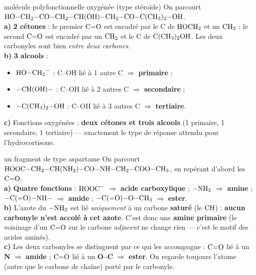 \documentclass[11pt,a4paper]{article}
\newcommand{\rep}[1]{\textcolor{primarydark}{\textbf{#1}}}
\begin{document}
\begin{corr}{molécule polyfonctionnelle oxygénée (type stéroïde)}
On parcourt $\ce{HO-CH2-CO-CH2-CH(OH)-CH2-CO-C(CH3)2-OH}$.\\
\textbf{a)} \rep{2 cétones} : le premier $\ce{C=O}$ est encadré par le C de $\ce{HOCH2}$ et un $\ce{CH2}$ ; le second $\ce{C=O}$ est encadré par un $\ce{CH2}$ et le C de $\ce{C(CH3)2OH}$. Les deux carbonyles sont bien \emph{entre deux carbones}.\\
\textbf{b)} \rep{3 alcools} :
\begin{itemize}[leftmargin=1.6em,itemsep=0pt]
  \item $\ce{HO-CH2-}$ : C--OH lié à 1 autre C $\Rightarrow$ \rep{primaire} ;
  \item $\ce{-CH(OH)-}$ : C--OH lié à 2 autres C $\Rightarrow$ \rep{secondaire} ;
  \item $\ce{-C(CH3)2-OH}$ : C--OH lié à 3 autres C $\Rightarrow$ \rep{tertiaire}.
\end{itemize}
\textbf{c)} Fonctions oxygénées : \rep{deux cétones et trois alcools} (1 primaire, 1 secondaire, 1 tertiaire) — exactement le type de réponse attendu pour l'hydrocortisone.
\end{corr}

\begin{corr}{un fragment de type aspartame}
On parcourt $\ce{HOOC-CH2-CH(NH2)-CO-NH-CH2-COO-CH3}$, en repérant d'abord les $\ce{C=O}$.\\
\textbf{a)} \rep{Quatre fonctions} : $\ce{HOOC-}$ $\Rightarrow$ \rep{acide carboxylique} ; $\ce{-NH2}$ $\Rightarrow$ \rep{amine} ; $\ce{-C(=O)-NH-}$ $\Rightarrow$ \rep{amide} ; $\ce{-C(=O)-O-CH3}$ $\Rightarrow$ \rep{ester}.\\
\textbf{b)} L'azote du $\ce{-NH2}$ est lié \emph{uniquement} à un carbone \textbf{saturé} (le $\ce{CH}$) : \textbf{aucun carbonyle n'est accolé à cet azote}. C'est donc une \rep{amine primaire} (le voisinage d'un $\ce{C=O}$ sur le carbone \emph{adjacent} ne change rien — c'est le motif des acides aminés).\\
\textbf{c)} Les deux carbonyles se distinguent par ce qui les accompagne : $\ce{C=O}$ lié à un \textbf{N} $\Rightarrow$ \rep{amide} ; $\ce{C=O}$ lié à un \textbf{O--C} $\Rightarrow$ \rep{ester}. On regarde toujours l'atome (autre que le carbone de chaîne) porté par le carbonyle.
\end{corr}
\end{document}
